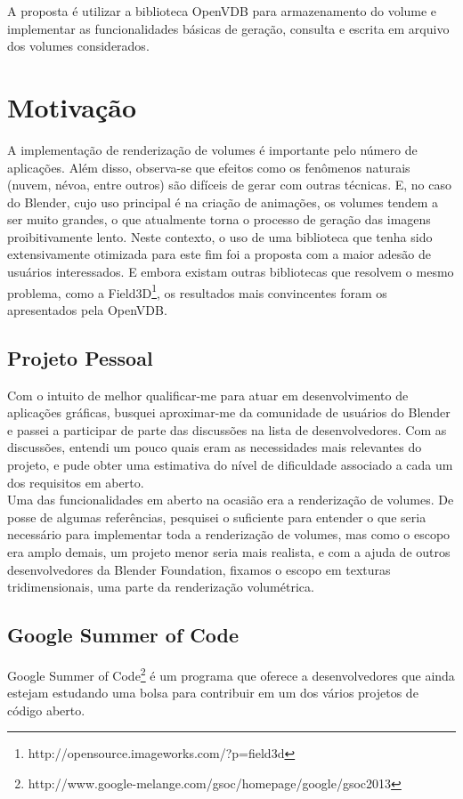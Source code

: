 A proposta é utilizar a biblioteca OpenVDB para armazenamento do volume e implementar as funcionalidades básicas de geração, consulta e escrita em arquivo dos volumes considerados.

\section{Motivação}

A implementação de renderização de volumes é importante pelo número de aplicações. Além disso, observa-se que efeitos como os fenômenos naturais (nuvem, névoa, entre outros) são difíceis de gerar com outras técnicas. E, no caso do Blender, cujo uso principal é na criação de animações, os volumes tendem a ser muito grandes, o que atualmente torna o processo de geração das imagens proibitivamente lento. Neste contexto, o uso de uma biblioteca que tenha sido extensivamente otimizada para este fim foi a proposta com a maior adesão de usuários interessados. E embora existam outras bibliotecas que resolvem o mesmo problema, como a Field3D\footnote{http://opensource.imageworks.com/?p=field3d}, os resultados mais convincentes foram os apresentados pela OpenVDB.


\subsection*{Projeto Pessoal}
Com o intuito de melhor qualificar-me para atuar em desenvolvimento de aplicações gráficas, busquei aproximar-me da comunidade de usuários do Blender e passei a participar de parte das discussões na lista de desenvolvedores. Com as discussões, entendi um pouco quais eram as necessidades mais relevantes do projeto, e pude obter uma estimativa do nível de dificuldade associado a cada um dos requisitos em aberto. \\

Uma das funcionalidades em aberto na ocasião era a renderização de volumes. De posse de algumas referências, pesquisei o suficiente para entender o que seria necessário para implementar toda a renderização de volumes, mas como o escopo era amplo demais, um projeto menor seria mais realista, e com a ajuda de outros desenvolvedores da Blender Foundation, fixamos o escopo em texturas tridimensionais, uma parte da renderização volumétrica. 

\subsection*{Google Summer of Code}
Google Summer of Code\footnote{http://www.google-melange.com/gsoc/homepage/google/gsoc2013} é um programa que oferece a desenvolvedores que ainda estejam estudando uma bolsa para contribuir em um dos vários projetos de código aberto. \\

